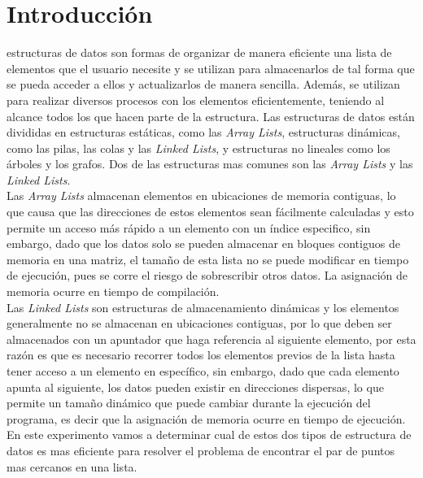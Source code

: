 \section{Introducción}
 estructuras de datos son formas de organizar de manera eficiente una lista de elementos que el usuario necesite y se utilizan para almacenarlos de tal forma que se pueda acceder a ellos y actualizarlos de manera sencilla. Además, se utilizan para realizar diversos procesos con los elementos eficientemente, teniendo al alcance todos los que hacen parte de la estructura. Las estructuras de datos están divididas en estructuras estáticas, como las \textit{Array Lists}, estructuras dinámicas, como las pilas, las colas y las \textit{Linked Lists}, y estructuras no lineales como los árboles y los grafos. Dos de las estructuras mas comunes son las \textit{Array Lists} y las \textit{Linked Lists}. \cite{DataStructures}\\

Las \textit{Array Lists} almacenan elementos en ubicaciones de memoria contiguas, lo que causa que las direcciones de estos elementos sean fácilmente calculadas y esto permite un acceso más rápido a un elemento con un índice especifico, sin embargo, dado que los datos solo se pueden almacenar en bloques contiguos de memoria en una matriz, el tamaño de esta lista no se puede modificar en tiempo de ejecución, pues se corre el riesgo de sobrescribir otros datos. La asignación de memoria ocurre en tiempo de compilación. \cite{LinkedListVSArray}\\

Las \textit{Linked Lists} son estructuras de almacenamiento dinámicas y los elementos generalmente no se almacenan en ubicaciones contiguas, por lo que deben ser almacenados con un apuntador que haga referencia al siguiente elemento, por esta razón es que es necesario recorrer todos los elementos previos de la lista hasta tener acceso a un elemento en específico, sin embargo, dado que cada elemento apunta al siguiente, los datos pueden existir en direcciones dispersas, lo que permite un tamaño dinámico que puede cambiar durante la ejecución del programa, es decir que la asignación de memoria ocurre en tiempo de ejecución. \cite{parlante2001linked}\\

En este experimento vamos a determinar cual de estos dos tipos de estructura de datos es mas eficiente para resolver el problema de encontrar el par de puntos mas cercanos en una lista.
